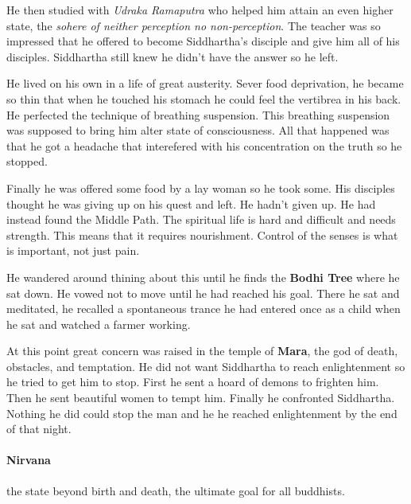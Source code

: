 \documentclass{article}
\begin{document}
He then studied with \emph{Udraka Ramaputra} who helped him attain an even higher state, the \emph{sohere of neither perception no non-perception}. The teacher was so impressed that he offered to become Siddhartha's disciple and give him all of his disciples. Siddhartha still knew he didn't have the answer so he left.

He lived on his own in a life of great austerity. Sever food deprivation, he became so thin that when he touched his stomach he could feel the vertibrea in his back. He perfected the technique of breathing suspension. This breathing suspension was supposed to bring him alter state of consciousness. All that happened was that he got a headache that interefered with his concentration on the truth so he stopped.

Finally he was offered some food by a lay woman so he took some. His disciples thought he was giving up on his quest and left. He hadn't given up. He had instead found the Middle Path. The spiritual life is hard and difficult and needs strength. This means that it requires nourishment. Control of the senses is what is important, not just pain.

He wandered around thining about this until he finds the \textbf{Bodhi Tree} where he sat down. He vowed not to move until he had reached his goal. There he sat and meditated, he recalled a spontaneous trance he had entered once as a child when he sat and watched a farmer working.

At this point great concern was raised in the temple of \textbf{Mara}, the god of death, obstacles, and temptation. He did not want Siddhartha to reach enlightenment so he tried to get him to stop. First he sent a hoard of demons to frighten him. Then he sent beautiful women to tempt him. Finally he confronted Siddhartha. Nothing he did could stop the man and he he reached enlightenment by the end of that night.

\paragraph{Nirvana}
\label{par:nirvana}
the state beyond birth and death, the ultimate goal for all buddhists.
\end{document}
